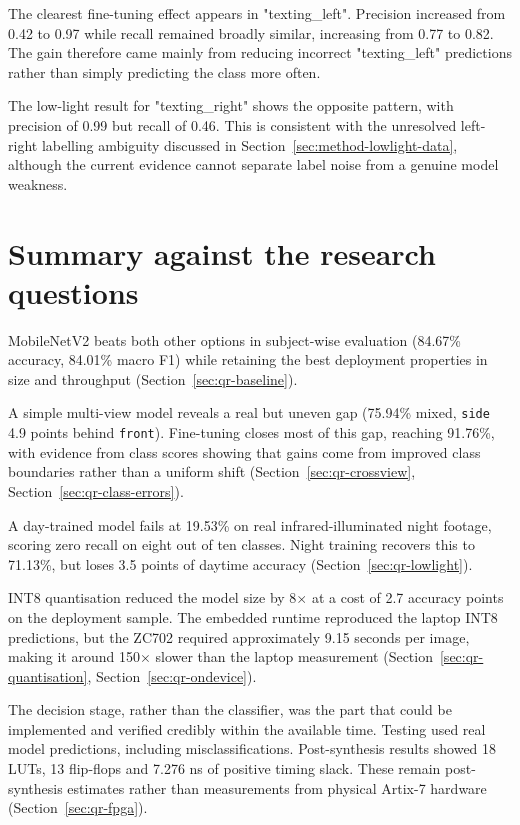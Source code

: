 The clearest fine-tuning effect appears in "texting\_left". Precision increased from 0.42 to 0.97 while recall remained broadly similar, increasing from 0.77 to 0.82. The gain therefore came mainly from reducing incorrect "texting\_left" predictions rather than simply predicting the class more often.

The low-light result for "texting\_right" shows the opposite pattern, with precision of 0.99 but recall of 0.46. This is consistent with the unresolved left-right labelling ambiguity discussed in Section~\ref{sec:method-lowlight-data}, although the current evidence cannot separate label noise from a genuine model weakness.

\section{Summary against the research questions}
\label{sec:qr-rq-summary}

\begin{description}[leftmargin=1.5em,style=nextline,itemsep=0.15em]
	\item[RQ1 - Model comparison.] MobileNetV2 beats both other options in subject-wise evaluation (84.67\% accuracy, 84.01\% macro F1) while retaining the best deployment properties in size and throughput (Section~\ref{sec:qr-baseline}).
	\item[RQ2 - Cross-view robustness.] A simple multi-view model reveals a real but uneven gap (75.94\% mixed, \texttt{side} 4.9 points behind \texttt{front}). Fine-tuning closes most of this gap, reaching 91.76\%, with evidence from class scores showing that gains come from improved class boundaries rather than a uniform shift (Section~\ref{sec:qr-crossview}, Section~\ref{sec:qr-class-errors}).
	\item[RQ3 - Lighting robustness.] A day-trained model fails at 19.53\% on real infrared-illuminated night footage, scoring zero recall on eight out of ten classes. Night training recovers this to 71.13\%, but loses 3.5 points of daytime accuracy (Section~\ref{sec:qr-lowlight}).
	\item[RQ4 - Quantisation and deployment cost.] INT8 quantisation reduced the model size by 8$\times$ at a cost of 2.7 accuracy points on the deployment sample. The embedded runtime reproduced the laptop INT8 predictions, but the ZC702 required approximately 9.15 seconds per image, making it around 150$\times$ slower than the laptop measurement (Section~\ref{sec:qr-quantisation}, Section~\ref{sec:qr-ondevice}).
	\item[RQ5 - What is credibly implementable in fabric.] The decision stage, rather than the classifier, was the part that could be implemented and verified credibly within the available time. Testing used real model predictions, including misclassifications. Post-synthesis results showed 18 LUTs, 13 flip-flops and 7.276 ns of positive timing slack. These remain post-synthesis estimates rather than measurements from physical Artix-7 hardware (Section~\ref{sec:qr-fpga}).
\end{description}